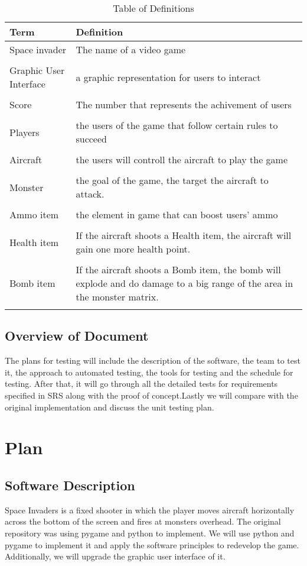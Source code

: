 \documentclass[12pt]{article}
\begin{document}
\begin{table}[htp]
\caption{Table of Definitions} \label{Table}
\begin{tabularx}{\textwidth}{p{3cm}X}
\toprule
\textbf{Term} & \textbf{Definition}\\
\midrule
Space invader & The name of a video game\\\\
Graphic User Interface & a graphic representation for users to interact\\\\
Score & The number that represents the achivement of users\\\\
Players & the users of the game that follow certain rules to succeed\\\\
Aircraft & the users will controll the aircraft to play the game\\\\
Monster & the goal of the game, the target the aircraft to attack.\\\\
Ammo item & the element in game that can boost users' ammo\\\\
Health item & If the aircraft shoots a Health item, the aircraft will gain one more health point.\\\\
Bomb item & If the aircraft shoots a Bomb item, the bomb will explode and do damage to a big range of the area in the
monster matrix.\\\\
\bottomrule
\end{tabularx}
\end{table}
\newpage	
\subsection{Overview of Document}
The plans for testing will include the description of the software, the team to test it, the approach to automated testing, the tools for testing and the schedule for testing. After that, it will go through all the detailed tests for requirements specified in SRS along with the proof of concept.Lastly we will compare with the original implementation and discuss the unit testing plan.
\section{Plan}	
\subsection{Software Description}
Space Invaders is a fixed shooter in which the player moves aircraft horizontally across the bottom of the screen and fires at monsters overhead. The original repository was using pygame and python to implement. We will use python and pygame to implement it and apply the software principles to redevelop the game. Additionally, we will upgrade the graphic user interface of it.
\end{document}
